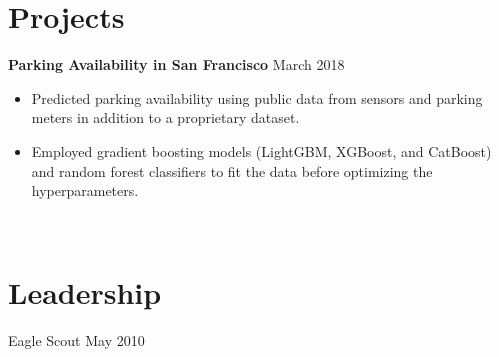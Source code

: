 \documentclass[line, margin]{res}
\begin{document}
\begin{resume}
\section{Projects}
	

	\textbf{Parking Availability in San Francisco} \hfill{March 2018}
	\begin{itemize}
		\item Predicted parking availability using public data from sensors and parking meters in addition to a proprietary dataset.
		\item Employed gradient boosting models (LightGBM, XGBoost, and CatBoost) and random forest classifiers to fit the data before optimizing the hyperparameters. %
	\end{itemize} \

		
\section{Leadership}
	Eagle Scout \hfill {May 2010}


\end{resume}
\end{document}
